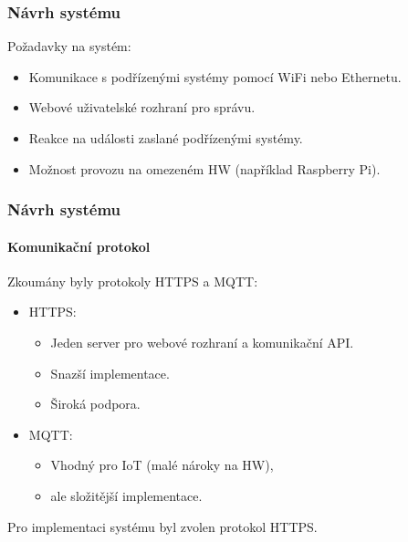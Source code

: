 \documentclass{beamer}
\begin{document}
  \begin{frame}
    \frametitle{Návrh systému}



      Požadavky na systém:

      \begin{itemize}
        \item Komunikace s podřízenými systémy pomocí WiFi nebo Ethernetu.
        \item Webové uživatelské rozhraní pro správu.
        \item Reakce na události zaslané podřízenými systémy.
        \item Možnost provozu na omezeném HW (například Raspberry Pi). %
      \end{itemize}
  \end{frame}

  \begin{frame}
    \frametitle{Návrh systému}
    \framesubtitle{Komunikační protokol}

    Zkoumány byly protokoly HTTPS a MQTT:

    \begin{itemize}
      \item HTTPS: 
      \begin{itemize}
        \item Jeden server pro webové rozhraní a komunikační API.
        \item Snazší implementace.
        \item Široká podpora.
      \end{itemize}
      \item MQTT:
      \begin{itemize}
        \item Vhodný pro IoT (malé nároky na HW),
        \item ale složitější implementace.
      \end{itemize}
    \end{itemize}

    Pro implementaci systému byl zvolen protokol HTTPS.


  \end{frame}
\end{document}
